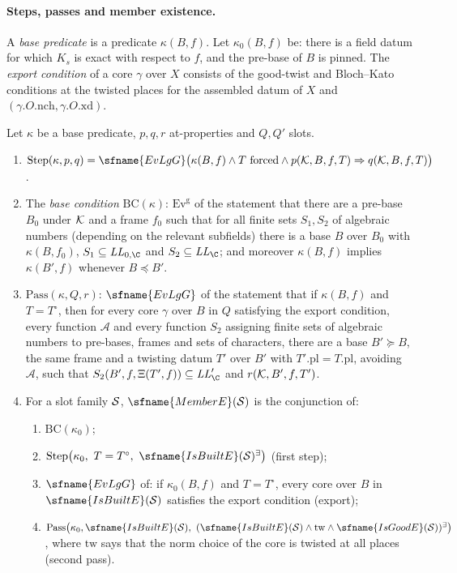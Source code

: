 \paragraph{Steps, passes and member existence.}
A \emph{base predicate} is a predicate $\kappa(B,f)$. Let $\kappa_0(B,f)$ be: there is a field datum for which $K_s$ is exact
with respect to $f$, and the pre-base of $B$ is pinned. The \emph{export condition} of a core $\gamma$ over $X$ consists of the
good-twist and Bloch--Kato conditions at the twisted places for the assembled datum of $X$ and
$(\gamma.O.\mathrm{nch},\gamma.O.\mathrm{xd})$.

\begin{definition}\label{pf:bundles:def:memberE}
Let $\kappa$ be a base predicate, $p,q,r$ at-properties and $Q,Q'$ slots.
\begin{enumerate}[label=(\alph*)]
\item $\mathrm{Step}(\kappa,p,q)=\sfname{EvLgG}\bigl(\kappa(B,f)\wedge T\text{ forced}\wedge p(\bundK,B,f,T)\Rightarrow
q(\bundK,B,f,T)\bigr)$.
\item The \emph{base condition} $\mathrm{BC}(\kappa)$: $\mathrm{Ev}^{\mathrm g}$ of the statement that there are a pre-base $B_0$
under $\mathcal K$ and a frame $f_0$ such that for all finite sets $S_1,S_2$ of algebraic numbers (depending on the relevant
subfields) there is a base $B$ over $B_0$ with $\kappa(B,f_0)$, $S_1\subseteq\mathit{LL}_{0,\C}$ and $S_2\subseteq\mathit{LL}_\C$;
and moreover $\kappa(B,f)$ implies $\kappa(B',f)$ whenever $B\preceq B'$.
\item $\mathrm{Pass}(\kappa,Q,r)$: $\sfname{EvLgG}$ of the statement that if $\kappa(B,f)$ and $T=T^\circ$, then for every core
$\gamma$ over $B$ in $Q$ satisfying the export condition, every function $\mathcal A$ and every function $S_2$ assigning finite
sets of algebraic numbers to pre-bases, frames and sets of characters, there are a base $B'\succeq B$, the same frame and a
twisting datum $T'$ over $B'$ with $T'.\mathrm{pl}=T.\mathrm{pl}$, avoiding $\mathcal A$, such that
$S_2(B',f,\Xi(T',f))\subseteq\mathit{LL}'_\C$ and $r(\mathcal K,B',f,T')$.
\item For a slot family $\mathcal S$, $\sfname{MemberE}(\bundS)$ is the conjunction of:
\begin{enumerate}[label=(M\arabic*)]
\item $\mathrm{BC}(\kappa_0)$;
\item $\mathrm{Step}\bigl(\kappa_0,\ T=T^\circ,\ \sfname{IsBuiltE}(\bundS)^\exists\bigr)$ (first step);
\item $\sfname{EvLgG}$ of: if $\kappa_0(B,f)$ and $T=T^\circ$, every core over $B$ in $\sfname{IsBuiltE}(\bundS)$ satisfies the
export condition (export);
\item $\mathrm{Pass}\bigl(\kappa_0,\sfname{IsBuiltE}(\bundS),\ (\sfname{IsBuiltE}(\bundS)\wedge\mathrm{tw}\wedge
\sfname{IsGoodE}(\bundS))^\exists\bigr)$, where $\mathrm{tw}$ says that the norm choice of the core is twisted at all places
(second pass).
\end{enumerate}
\end{enumerate}
\end{definition}

